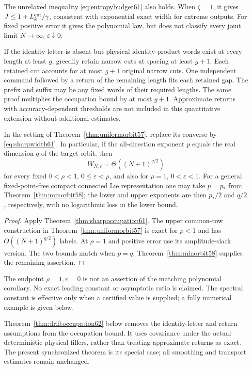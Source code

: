 \begin{remark}\label{rem:endbudget61}
The unrelaxed inequality \eqref{eq:entropybudget61} also holds.
When $\zeta=1$, it gives $J\le1+L_k^{\rm ent}/\gamma$, consistent
with exponential exact width for extreme outputs. For fixed positive
error it gives the polynomial law, but does not classify every joint
limit $N\to\infty$, $\varepsilon\downarrow0$.

If the identity letter is absent but physical identity-product words
exist at every length at least $g$, greedily retain narrow cuts at
spacing at least $g+1$. Each retained cut accounts for at most $g+1$
original narrow cuts. One independent command followed by a return of
the remaining length fits each retained gap. The prefix and suffix
may be any fixed words of their required lengths. The same proof
multiplies the occupation bound by at most $g+1$. Approximate returns
with accuracy-dependent thresholds are not included in this quantitative
extension without additional estimates.
\end{remark}

\begin{corollary}\label{cor:matchedorbits61}
In the setting of Theorem~\ref{thm:uniformorbit57}, replace its converse
by \eqref{eq:sharpwidth61}. In particular, if the all-direction exponent
$p$ equals the real dimension $q$ of the target orbit, then
\[
 W_{N,\varepsilon}=\Theta((N+1)^{q/2})
\]
for every fixed $0<\rho<1$, $0\le\varepsilon<\rho$, and also for
$\rho=1$, $0<\varepsilon<1$. For a general fixed-point-free compact
connected Lie representation one may take $p=p_*$ from
Theorem~\ref{thm:minorbit58}; the lower and upper exponents are then
$p_*/2$ and $q/2$, respectively, with no logarithmic loss in the lower
bound.
\end{corollary}
\begin{proof}
Apply Theorem~\ref{thm:sharpoccupation61}. The upper common-row
construction in Theorem~\ref{thm:uniformorbit57} is exact for
$\rho<1$ and has $O((N+1)^{q/2})$ labels. At $\rho=1$ and positive
error use its amplitude-slack version. The two bounds match when
$p=q$. Theorem~\ref{thm:minorbit58} supplies the remaining assertion.
\end{proof}
The endpoint $\rho=1,\varepsilon=0$ is not an assertion of the matching
polynomial corollary. No exact leading constant or asymptotic ratio is
claimed. The spectral constant is effective only when a certified value
is supplied; a fully numerical example is given below.

\begin{remark}
Theorem~\ref{thm:driftoccupation62} below removes the identity-letter
and return assumptions from the occupation bound. It uses covariance
under the actual deterministic physical fillers, rather than treating
approximate returns as exact. The present synchronized theorem is its
special case; all smoothing and transport estimates remain unchanged.
\end{remark}
